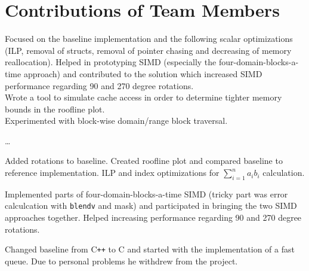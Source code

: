 \section{Contributions of Team Members}

 Focused on the baseline implementation and the following scalar optimizations 
(ILP, removal of structs, removal of pointer chasing and decreasing of memory reallocation). 
Helped in prototyping SIMD (especially the four-domain-blocks-a-time approach) 
and contributed to the solution which increased SIMD performance regarding 90 and 270 degree rotations. \\
Wrote a tool to simulate cache access in order to determine tighter memory bounds in the roofline plot. \\
Experimented with block-wise domain/range block traversal.

 \dots

 Added rotations to baseline. Created roofline plot and compared baseline to reference 
implementation. ILP and index optimizations for $\sum_{i=1}^n a_i b_i$ calculation. 

Implemented parts of four-domain-blocks-a-time SIMD (tricky part was error calculcation with 
\verb|blendv| and mask) and participated in bringing the two SIMD approaches together. 
Helped increasing performance regarding 90 and 270 degree rotations.

 Changed baseline from C\texttt{++} to C and started with the implementation of a fast queue.
Due to personal problems he withdrew from the project.
